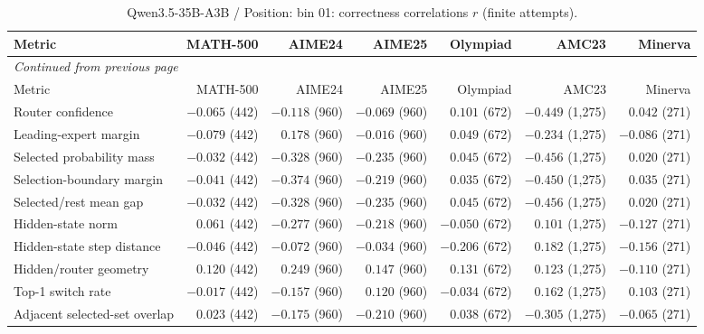 \begingroup\scriptsize\setlength{\tabcolsep}{4pt}
\begin{longtable}{@{}lrrrrrr@{}}
\caption{Qwen3.5-35B-A3B / Position: bin 01: correctness correlations $r$ (finite attempts).}\label{tab:multi-qwen-position-bin_01}\\
\toprule
Metric & MATH-500 & AIME24 & AIME25 & Olympiad & AMC23 & Minerva \\
\midrule\endfirsthead
\multicolumn{7}{l}{\textit{Continued from previous page}}\\
\toprule
Metric & MATH-500 & AIME24 & AIME25 & Olympiad & AMC23 & Minerva \\
\midrule\endhead
\bottomrule\endfoot
Router confidence & $-0.065$ (442) & $-0.118$ (960) & $-0.069$ (960) & $0.101$ (672) & $-0.449$ (1,275) & $0.042$ (271) \\
Leading-expert margin & $-0.079$ (442) & $0.178$ (960) & $-0.016$ (960) & $0.049$ (672) & $-0.234$ (1,275) & $-0.086$ (271) \\
Selected probability mass & $-0.032$ (442) & $-0.328$ (960) & $-0.235$ (960) & $0.045$ (672) & $-0.456$ (1,275) & $0.020$ (271) \\
Selection-boundary margin & $-0.041$ (442) & $-0.374$ (960) & $-0.219$ (960) & $0.035$ (672) & $-0.450$ (1,275) & $0.035$ (271) \\
Selected/rest mean gap & $-0.032$ (442) & $-0.328$ (960) & $-0.235$ (960) & $0.045$ (672) & $-0.456$ (1,275) & $0.020$ (271) \\
Hidden-state norm & $0.061$ (442) & $-0.277$ (960) & $-0.218$ (960) & $-0.050$ (672) & $0.101$ (1,275) & $-0.127$ (271) \\
Hidden-state step distance & $-0.046$ (442) & $-0.072$ (960) & $-0.034$ (960) & $-0.206$ (672) & $0.182$ (1,275) & $-0.156$ (271) \\
Hidden/router geometry & $0.120$ (442) & $0.249$ (960) & $0.147$ (960) & $0.131$ (672) & $0.123$ (1,275) & $-0.110$ (271) \\
Top-1 switch rate & $-0.017$ (442) & $-0.157$ (960) & $0.120$ (960) & $-0.034$ (672) & $0.162$ (1,275) & $0.103$ (271) \\
Adjacent selected-set overlap & $0.023$ (442) & $-0.175$ (960) & $-0.210$ (960) & $0.038$ (672) & $-0.305$ (1,275) & $-0.065$ (271) \\
\end{longtable}\endgroup


